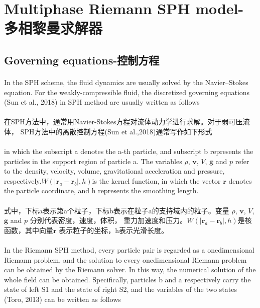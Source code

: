 \documentclass[UTF8]{ctexart}
\begin{document}
\section{Multiphase Riemann SPH model-多相黎曼求解器}

\subsection{Governing equations-控制方程}
\paragraph{\quad}In the SPH scheme, the fluid dynamics are usually solved 
                by the Navier–Stokes equation. For the weakly-compressible fluid, 
                the discretized governing equations (Sun et al., 2018) in SPH 
                method are usually written as follows
\paragraph{\quad}在SPH方法中，通常用Navier-Stokes方程对流体动力学进行求解。对于弱可压流体，
                SPH方法中的离散控制方程(Sun et al.,2018)通常写作如下形式


\paragraph{\quad}in which the subscript a denotes the a-th particle, and subscript
                 b represents the particles in the support region of particle a. 
                 The variables $\rho$, $\mathbf{v}$, $V$, $\mathbf{g}$ and $p$ refer 
                 to the density, velocity, volume, gravitational acceleration and 
                 pressure, respectively.$W(|\mathbf{r}_a-\mathbf{r}_b|, h) $is the kernel function, 
                 in which the vector $\mathbf{r}$ denotes the particle coordinate, and h 
                 represents the smoothing length.
\paragraph{\quad}式中，下标a表示第a个粒子，下标b表示在粒子a的支持域内的粒子。变量
                $\rho$, $\mathbf{v}$, $V$, $\mathbf{g}$ and $p$ 分别代表密度，速度，体积，
                重力加速度和压力。$W(|\mathbf{r}_a-\mathbf{r}_b|, h) $是核函数，其中向量$\mathbf{r}$
                表示粒子的坐标，h表示光滑长度。

\paragraph{\quad}In the Riemann SPH method, every particle pair is regarded as a onedimensional 
                Riemann problem, and the solution to every onedimensional Riemann problem can 
                be obtained by the Riemann solver. In this way, the numerical solution of the whole 
                field can be obtained. Specifically, particles b and a respectively carry the state 
                of left S1 and the state of right S2, and the variables of the two states (Toro, 2013) 
                can be written as follows
\end{document}
